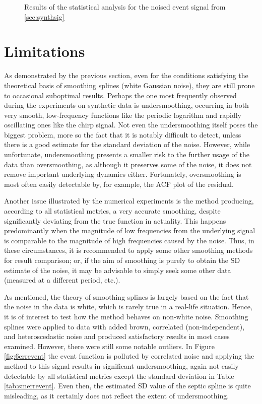 \documentclass[11pt,leqno]{book}
\theoremstyle{definition}
\theoremstyle{plain}
\theoremstyle{definition}
\begin{document}
{\begin{figure}[H]
\caption{Results of the statistical analysis for the noised event signal from \ref{sec:synthsig}}
\label{fig:6event}
\end{figure}
\begin{table}[H]
\centering
\caption{Statistical metrics for the event signal}

\label{tab:smevent}
\end{table}
\section{Limitations}
As demonstrated by the previous section, even for the conditions satisfying the theoretical basis of smoothing splines (white Gaussian noise), they are still prone to occasional suboptimal results. Perhaps the one most frequently observed during the experiments on synthetic data is undersmoothing, occurring in both very smooth, low-frequency functions like the periodic logarithm and rapidly oscillating ones like the chirp signal. Not even the undersmoothing itself poses the biggest problem, more so the fact that it is notably difficult to detect, unless there is a good estimate for the standard deviation of the noise. However, while unfortunate, undersmoothing presents a smaller risk to the further usage of the data than oversmoothing, as although it preserves some of the noise, it does not remove important underlying dynamics either. Fortunately, oversmoothing is most often easily detectable by, for example, the ACF plot of the residual.

Another issue illustrated by the numerical experiments is the method producing, according to all statistical metrics, a very accurate smoothing, despite significantly deviating from the true function in actuality. This happens predominantly when the magnitude of low frequencies from the underlying signal is comparable to the magnitude of high frequencies caused by the noise. Thus, in these circumstances, it is recommended to apply some other smoothing methods for result comparison; or, if the aim of smoothing is purely to obtain the SD estimate of the noise, it may be advisable to simply seek some other data (measured at a different period, etc.).

As mentioned, the theory of smoothing splines is largely based on the fact that the noise in the data is white, which is rarely true in a real-life situation. Hence, it is of interest to test how the method behaves on non-white noise. Smoothing splines were applied to data with added brown, correlated (non-independent), and heteroscedastic noise and produced satisfactory results in most cases examined. However, there were still some notable outliers. In Figure \ref{fig:6errevent} the event function is polluted by correlated noise and applying the method to this signal results in significant undersmoothing, again not easily detectable by all statistical metrics except the standard deviation in Table \ref{tab:smerrevent}. Even then, the estimated SD value of the septic spline is quite misleading, as it certainly does not reflect the extent of undersmoothing. 
\begin{figure}[H]
\centering


\end{figure}}
\end{document}
